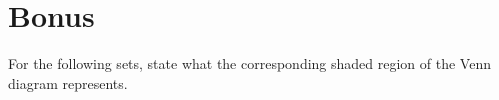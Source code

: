 \begin{questions}
\begin{solution}
\begin{enumerate}[label=(\alph*),itemsep=4pt,parsep=0pt,topsep=0pt,partopsep=0pt]
	\end{enumerate}
	\end{solution}



\section*{Bonus}

\bonusquestion[1] For the following sets, state what the  corresponding shaded region of the Venn diagram represents. 









\end{questions}

